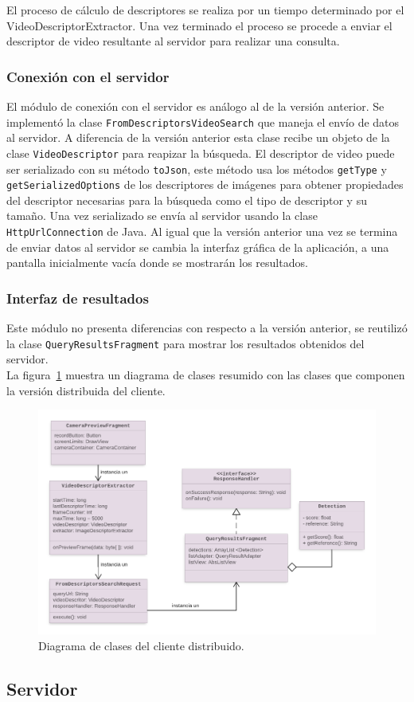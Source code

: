 El proceso de cálculo de descriptores se realiza por un tiempo determinado por el VideoDescriptorExtractor. Una vez terminado el proceso se procede a enviar el descriptor de video resultante al servidor para realizar una consulta.

\subsubsection*{Conexión con el servidor}
 El módulo de conexión con el servidor es análogo al de la versión anterior. Se implementó la clase \texttt{FromDescriptorsVideoSearch} que maneja el envío de datos al servidor. A diferencia de la versión anterior esta clase recibe un objeto de la clase \texttt{VideoDescriptor} para reapizar la búsqueda. El descriptor de video puede ser serializado con su método \texttt{toJson}, este método usa los métodos \texttt{getType} y \texttt{getSerializedOptions} de los descriptores de imágenes para obtener propiedades del descriptor necesarias para la búsqueda como el tipo de descriptor y su tamaño. Una vez serializado se envía al servidor usando la clase \texttt{HttpUrlConnection} de Java. Al igual que la versión anterior una vez se termina de enviar datos al servidor se cambia la interfaz gráfica de la aplicación, a una pantalla inicialmente vacía donde se mostrarán los resultados.

\subsubsection*{Interfaz de resultados}
Este módulo no presenta diferencias con respecto a la versión anterior, se reutilizó la clase \texttt{QueryResultsFragment} para mostrar los resultados obtenidos del servidor.\\

La figura~\ref{diagrama_cliente_distribuido} muestra un diagrama de clases resumido con las clases que componen la versión distribuida del cliente.
	\begin{figure}[!h]
		\centering
		\includegraphics[scale=1.6]{imagenes/cap4/diagrama_cliente_distribuido.png}
		\caption{Diagrama de clases del cliente distribuido.}
		\label{diagrama_cliente_distribuido}
	\end{figure}
\subsection{Servidor}
